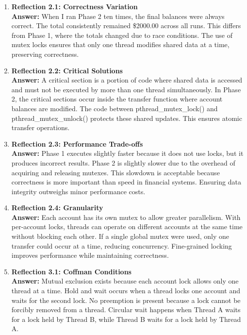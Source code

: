 \documentclass[12pt]{article}
\begin{document}
\begin{enumerate}
\item \textbf{Reflection 2.1: Correctness Variation} \\
\textbf{Answer:} When I ran Phase 2 ten times, the final balances were always correct. The total consistently remained \$2000.00
 across all runs. This differs from Phase 1, where the totals changed due to race conditions. The use of mutex locks ensures that only one
 thread modifies shared data at a time, preserving correctness.

\item \textbf{Reflection 2.2: Critical Solutions} \\
\textbf{Answer:} A critical section is a portion of code where shared data is accessed and must not be executed by more than one
 thread simultaneously. In Phase 2, the critical sections occur inside the transfer function where account balances are modified. The code
 between pthread\_mutex\_lock() and pthread\_mutex\_unlock() protects these shared updates. This ensures atomic transfer operations.

\item \textbf{Reflection 2.3: Performance Trade-offs} \\
\textbf{Answer:} Phase 1 executes slightly faster because it does not use locks, but it produces incorrect results. Phase 2 is
 slightly slower due to the overhead of acquiring and releasing mutexes. This slowdown is acceptable because correctness is more important
 than speed in financial systems. Ensuring data integrity outweighs minor performance costs.

\item \textbf{Reflection 2.4: Granularity} \\
\textbf{Answer:} Each account has its own mutex to allow greater parallelism. With per-account locks, threads can operate on
 different accounts at the same time without blocking each other. If a single global mutex were used, only one transfer could occur at a
 time, reducing concurrency. Fine-grained locking improves performance while maintaining correctness.

\item \textbf{Reflection 3.1: Coffman Conditions} \\
\textbf{Answer:} Mutual exclusion exists because each account lock allows only one thread at a time. Hold and wait occurs when a
 thread locks one account and waits for the second lock. No preemption is present because a lock cannot be forcibly removed from a thread.
 Circular wait happens when Thread A waits for a lock held by Thread B, while Thread B waits for a lock held by Thread A.


\end{enumerate}
\end{document}
